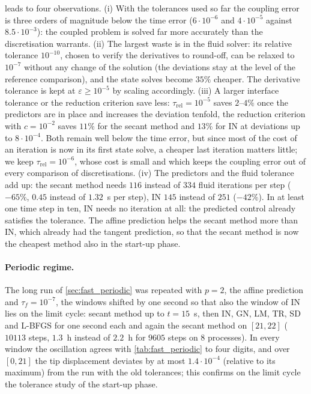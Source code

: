 \documentclass[11pt,a4paper]{article}
\theoremstyle{definition}
\theoremstyle{remark}
\begin{document}
 leads to four observations. (i) With the tolerances used so far the
coupling error is three orders of magnitude below the time error ($6\cdot10^{-6}$ and
$4\cdot10^{-5}$ against $8.5\cdot10^{-3}$): the coupled problem is solved far more accurately
than the discretisation warrants. (ii) The largest waste is in the fluid solver: its relative
tolerance $10^{-10}$, chosen to verify the derivatives to round-off, can be relaxed to $10^{-7}$
without any change of the solution (the deviations stay at the level of the reference
comparison), and the state solves become $35\%$ cheaper. The derivative tolerance is kept at
$\varepsilon\ge10^{-5}$ by scaling  accordingly. (iii) A larger
interface tolerance or the reduction criterion save less: $\tau_{\mathrm{rel}}=10^{-5}$ saves
$2$--$4\%$ once the predictors are in place and increases the deviation tenfold, the reduction
criterion with $c=10^{-2}$ saves $11\%$ for the secant method and $13\%$ for IN at
deviations up to $8\cdot10^{-4}$. Both remain well below the time error, but since most of the cost
of an iteration is now in its first state solve, a cheaper last iteration matters little; we keep
$\tau_{\mathrm{rel}}=10^{-6}$, whose cost is small and which keeps the coupling error out of every
comparison of discretisations. (iv) The predictors and the fluid tolerance add up: the secant method
needs $116$ instead of $334$ fluid iterations per step ($-65\%$, $0.45$ instead of $1.32$~s per
step), IN $145$ instead of $251$ ($-42\%$). In at least one time step in ten, IN needs no iteration at all: the predicted control
already satisfies the tolerance. The affine prediction
helps the secant method more than IN, which already had the tangent prediction, so that the secant
method is now the cheapest method also in the start-up phase.

\paragraph{Periodic regime.} The long run of \cref{sec:fast_periodic} was repeated with $p=2$, the
affine prediction and $\tau_f=10^{-7}$, the windows shifted by one second so that also the window
of IN lies on the limit cycle: secant method up to $t=15$~s, then IN, GN, LM, TR, SD and L-BFGS for
one second each and again the secant method on $[21,22]$ ($10113$ steps, $1.3$~h instead of
$2.2$~h for $9605$ steps on $8$ processes). In every window the oscillation agrees with
\cref{tab:fast_periodic} to four digits, and over $[0,21]$ the tip displacement deviates by at most
$1.4\cdot10^{-4}$ (relative to its maximum) from the run with the old tolerances; this confirms on
the limit cycle the tolerance study of the start-up phase.
\end{document}
